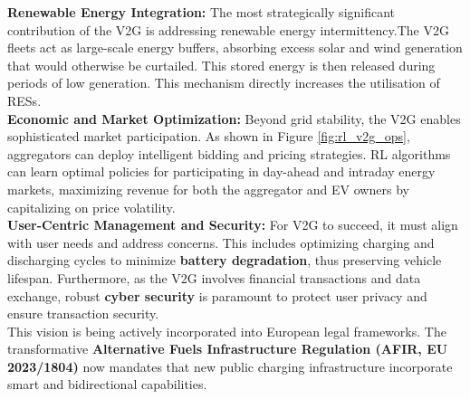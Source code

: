 \noindent
\textbf{Renewable Energy Integration:} The most strategically significant contribution of the V2G is addressing renewable energy intermittency.The V2G fleets act as large-scale energy buffers, absorbing excess solar and wind generation that would otherwise be curtailed. This stored energy is then released during periods of low generation. This mechanism directly increases the utilisation of RESs.
\\
\noindent
\textbf{Economic and Market Optimization:} Beyond grid stability, the V2G enables sophisticated market participation. As shown in Figure \ref{fig:rl_v2g_ops}, aggregators can deploy intelligent bidding and pricing strategies. RL algorithms can learn optimal policies for participating in day-ahead and intraday energy markets, maximizing revenue for both the aggregator and EV owners by capitalizing on price volatility.
\\
\noindent
\textbf{User-Centric Management and Security:} For V2G to succeed, it must align with user needs and address concerns. This includes optimizing charging and discharging cycles to minimize \textbf{battery degradation}, thus preserving vehicle lifespan. Furthermore, as the V2G involves financial transactions and data exchange, robust \textbf{cyber security} is paramount to protect user privacy and ensure transaction security.
\\
\noindent
This vision is being actively incorporated into European legal frameworks. The transformative \textbf{Alternative Fuels Infrastructure Regulation (AFIR, EU 2023/1804)} now mandates that new public charging infrastructure incorporate smart and bidirectional capabilities. 

